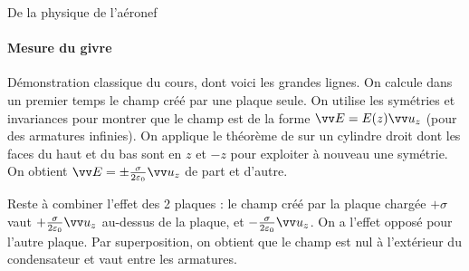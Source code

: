 \begin{exo}[PC][1][devoir]{De la physique de l'aéronef}
\begin{quest}
    \end{quest}
      
      \paragraph{Mesure du givre}


\begin{quest}
  {
    Démonstration classique du cours, dont voici les grandes lignes. On calcule dans un premier temps le champ créé par une plaque seule. On utilise les symétries et invariances pour montrer que le champ est de la forme $\vv E=E(z)\vv u_z$ (pour des armatures infinies). On applique le théorème de  sur un cylindre droit dont les faces du haut et du bas sont en $z$ et $-z$ pour exploiter à nouveau une symétrie. On obtient $\vv E=\pm\frac{\sigma}{2\varepsilon_0}\vv u_z$ de part et d'autre.

    Reste à combiner l'effet des 2 plaques : le champ créé par la plaque chargée $+\sigma$ vaut $+\frac{\sigma}{2\varepsilon_0}\vv u_z$ au-dessus de la plaque, et $-\frac{\sigma}{2\varepsilon_0}\vv u_z$. On a l'effet opposé pour l'autre plaque. Par superposition, on obtient que le champ est nul à l'extérieur du condensateur et vaut  entre les armatures.
    
}
\end{quest}
\end{exo}
